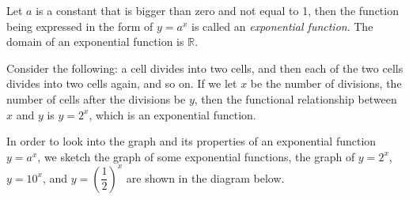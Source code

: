 \documentclass[12pt]{report}
\begin{document}
Let $a$ is a constant that is bigger than zero and not equal to 1, then the
function being expressed in the form of $y = a^x$ is called an
\emph{exponential function}. The domain of an exponential function is
$\mathbb{R}$.

Consider the following: a cell divides into two cells, and then each of the two
cells divides into two cells again, and so on. If we let $x$ be the number of
divisions, the number of cells after the divisions be $y$, then the functional
relationship between $x$ and $y$ is $y = 2^x$, which is an exponential
function.

In order to look into the graph and its properties of an exponential function
$y = a^x$, we sketch the graph of some exponential functions, the graph of $y =
    2^x$, $y = 10^x$, and $y = \left(\dfrac{1}{2}\right)^x$ are shown in the
diagram below.
\end{document}
